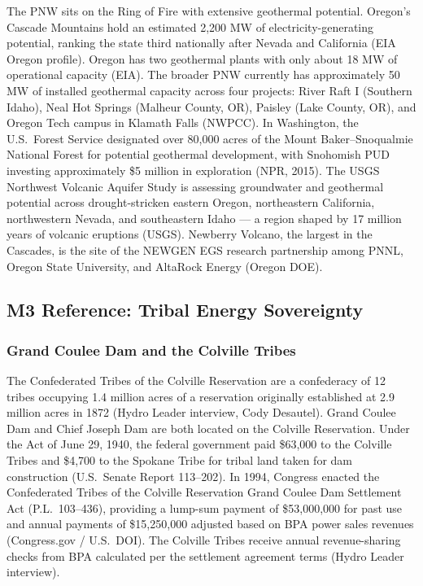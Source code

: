 \documentclass[11pt,letterpaper]{article}
\begin{document}
The PNW sits on the Ring of Fire with extensive geothermal potential. Oregon's Cascade Mountains hold an estimated 2,200 MW of electricity-generating potential, ranking the state third nationally after Nevada and California (EIA Oregon profile). Oregon has two geothermal plants with only about 18 MW of operational capacity (EIA). The broader PNW currently has approximately 50 MW of installed geothermal capacity across four projects: River Raft I (Southern Idaho), Neal Hot Springs (Malheur County, OR), Paisley (Lake County, OR), and Oregon Tech campus in Klamath Falls (NWPCC). In Washington, the U.S.\ Forest Service designated over 80,000 acres of the Mount Baker--Snoqualmie National Forest for potential geothermal development, with Snohomish PUD investing approximately \$5 million in exploration (NPR, 2015). The USGS Northwest Volcanic Aquifer Study is assessing groundwater and geothermal potential across drought-stricken eastern Oregon, northeastern California, northwestern Nevada, and southeastern Idaho --- a region shaped by 17 million years of volcanic eruptions (USGS). Newberry Volcano, the largest in the Cascades, is the site of the NEWGEN EGS research partnership among PNNL, Oregon State University, and AltaRock Energy (Oregon DOE).

\subsection{M3 Reference: Tribal Energy Sovereignty}

\subsubsection{Grand Coulee Dam and the Colville Tribes}

The Confederated Tribes of the Colville Reservation are a confederacy of 12 tribes occupying 1.4 million acres of a reservation originally established at 2.9 million acres in 1872 (Hydro Leader interview, Cody Desautel). Grand Coulee Dam and Chief Joseph Dam are both located on the Colville Reservation. Under the Act of June 29, 1940, the federal government paid \$63,000 to the Colville Tribes and \$4,700 to the Spokane Tribe for tribal land taken for dam construction (U.S.\ Senate Report 113--202). In 1994, Congress enacted the Confederated Tribes of the Colville Reservation Grand Coulee Dam Settlement Act (P.L.\ 103--436), providing a lump-sum payment of \$53,000,000 for past use and annual payments of \$15,250,000 adjusted based on BPA power sales revenues (Congress.gov / U.S.\ DOI). The Colville Tribes receive annual revenue-sharing checks from BPA calculated per the settlement agreement terms (Hydro Leader interview).
\end{document}
